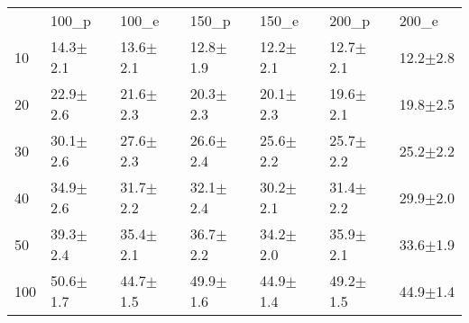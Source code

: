 \begin{tabular}{lllllll}
 & 100_p & 100_e & 150_p & 150_e & 200_p & 200_e \\
10 & {\cellcolor[HTML]{A7A7A7}} \color[HTML]{F1F1F1} 14.3$\pm$2.1 & {\cellcolor[HTML]{A7A7A7}} \color[HTML]{F1F1F1} 13.6$\pm$2.1 & {\cellcolor[HTML]{A8A8A8}} \color[HTML]{F1F1F1} 12.8$\pm$1.9 & {\cellcolor[HTML]{A0A0A0}} \color[HTML]{F1F1F1} 12.2$\pm$2.1 & {\cellcolor[HTML]{A3A3A3}} \color[HTML]{F1F1F1} 12.7$\pm$2.1 & {\cellcolor[HTML]{959595}} \color[HTML]{F1F1F1} 12.2$\pm$2.8 \\
20 & {\cellcolor[HTML]{B4B4B4}} \color[HTML]{000000} 22.9$\pm$2.6 & {\cellcolor[HTML]{B8B8B8}} \color[HTML]{000000} 21.6$\pm$2.3 & {\cellcolor[HTML]{B3B3B3}} \color[HTML]{000000} 20.3$\pm$2.3 & {\cellcolor[HTML]{B4B4B4}} \color[HTML]{000000} 20.1$\pm$2.3 & {\cellcolor[HTML]{B6B6B6}} \color[HTML]{000000} 19.6$\pm$2.1 & {\cellcolor[HTML]{AEAEAE}} \color[HTML]{000000} 19.8$\pm$2.5 \\
30 & {\cellcolor[HTML]{BFBFBF}} \color[HTML]{000000} 30.1$\pm$2.6 & {\cellcolor[HTML]{C1C1C1}} \color[HTML]{000000} 27.6$\pm$2.3 & {\cellcolor[HTML]{BEBEBE}} \color[HTML]{000000} 26.6$\pm$2.4 & {\cellcolor[HTML]{C1C1C1}} \color[HTML]{000000} 25.6$\pm$2.2 & {\cellcolor[HTML]{BFBFBF}} \color[HTML]{000000} 25.7$\pm$2.2 & {\cellcolor[HTML]{BFBFBF}} \color[HTML]{000000} 25.2$\pm$2.2 \\
40 & {\cellcolor[HTML]{C5C5C5}} \color[HTML]{000000} 34.9$\pm$2.6 & {\cellcolor[HTML]{C7C7C7}} \color[HTML]{000000} 31.7$\pm$2.2 & {\cellcolor[HTML]{C5C5C5}} \color[HTML]{000000} 32.1$\pm$2.4 & {\cellcolor[HTML]{C7C7C7}} \color[HTML]{000000} 30.2$\pm$2.1 & {\cellcolor[HTML]{C8C8C8}} \color[HTML]{000000} 31.4$\pm$2.2 & {\cellcolor[HTML]{C9C9C9}} \color[HTML]{000000} 29.9$\pm$2.0 \\
50 & {\cellcolor[HTML]{CCCCCC}} \color[HTML]{000000} 39.3$\pm$2.4 & {\cellcolor[HTML]{CDCDCD}} \color[HTML]{000000} 35.4$\pm$2.1 & {\cellcolor[HTML]{CDCDCD}} \color[HTML]{000000} 36.7$\pm$2.2 & {\cellcolor[HTML]{D0D0D0}} \color[HTML]{000000} 34.2$\pm$2.0 & {\cellcolor[HTML]{CECECE}} \color[HTML]{000000} 35.9$\pm$2.1 & {\cellcolor[HTML]{D0D0D0}} \color[HTML]{000000} 33.6$\pm$1.9 \\
100 & {\cellcolor[HTML]{E1E1E1}} \color[HTML]{000000} 50.6$\pm$1.7 & {\cellcolor[HTML]{E3E3E3}} \color[HTML]{000000} 44.7$\pm$1.5 & {\cellcolor[HTML]{E4E4E4}} \color[HTML]{000000} 49.9$\pm$1.6 & {\cellcolor[HTML]{E4E4E4}} \color[HTML]{000000} 44.9$\pm$1.4 & {\cellcolor[HTML]{E5E5E5}} \color[HTML]{000000} 49.2$\pm$1.5 & {\cellcolor[HTML]{E7E7E7}} \color[HTML]{000000} 44.9$\pm$1.4 \\

\end{tabular}
